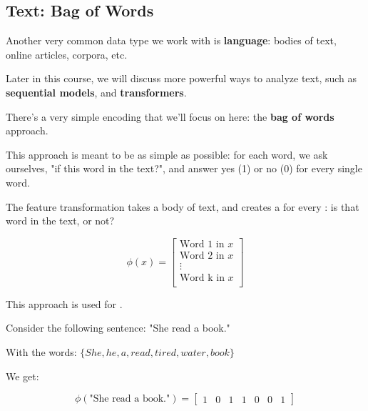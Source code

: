         \subsection*{Text: Bag of Words}


            Another very common data type we work with is \textbf{language}: bodies of text, online articles, corpora, etc.

            Later in this course, we will discuss more powerful ways to analyze text, such as \textbf{sequential models}, and \textbf{transformers}.

            There's a very simple encoding that we'll focus on here: the \textbf{bag of words} approach.

            This approach is meant to be as simple as possible: for each word, we ask ourselves, "if this word in the text?", and answer yes (1) or no (0) for every single word.\\

            \begin{definition}
                The  feature transformation takes a body of text, and creates a  for every : is that word in the text, or not?

                \begin{equation}
                    \phi(x) = 
                    \begin{bmatrix}
                        \text{Word 1 in } x \\
                        \text{Word 2 in } x \\
                        \vdots \\
                        \text{Word k in } x \\
                    \end{bmatrix}
                \end{equation}

                This approach is used for .
            \end{definition}

            \miniex Consider the following sentence: "She read a book."

            With the words: $\{She, he, a, read, tired, water, book\}$

            We get:

            \begin{equation}
                \phi(\text{"She read a book."}) =
                \begin{bmatrix}
                    1& 0& 1& 1& 0& 0& 1
                \end{bmatrix}
            \end{equation}

